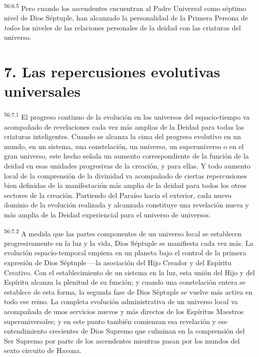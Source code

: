 \par
\textsuperscript{56:6.5} Pero cuando los ascendentes encuentran al Padre Universal como séptimo nivel de Dios Séptuple, han alcanzado la personalidad de la Primera Persona de \textit{todos} los niveles de las relaciones personales de la deidad con las criaturas del universo.

\section*{7. Las repercusiones evolutivas universales}
\par
\textsuperscript{56:7.1} El progreso continuo de la evolución en los universos del espacio-tiempo va acompañado de revelaciones cada vez más amplias de la Deidad para todas las criaturas inteligentes. Cuando se alcanza la cima del progreso evolutivo en un mundo, en un sistema, una constelación, un universo, un superuniverso o en el gran universo, este hecho señala un aumento correspondiente de la función de la deidad en esas unidades progresivas de la creación, y para ellas. Y todo aumento local de la comprensión de la divinidad va acompañado de ciertas repercusiones bien definidas de la manifestación más amplia de la deidad para todos los otros sectores de la creación. Partiendo del Paraíso hacia el exterior, cada nuevo dominio de la evolución realizada y alcanzada constituye una revelación nueva y más amplia de la Deidad experiencial para el universo de universos.

\par
\textsuperscript{56:7.2} A medida que las partes componentes de un universo local se establecen progresivamente en la luz y la vida, Dios Séptuple se manifiesta cada vez más. La evolución espacio-temporal empieza en un planeta bajo el control de la primera expresión de Dios Séptuple ---la asociación del Hijo Creador y del Espíritu Creativo. Con el establecimiento de un sistema en la luz, esta unión del Hijo y del Espíritu alcanza la plenitud de su función; y cuando una constelación entera se establece de esta forma, la segunda fase de Dios Séptuple se vuelve más activa en todo ese reino. La completa evolución administrativa de un universo local va acompañada de unos servicios nuevos y más directos de los Espíritus Maestros superuniversales; y en este punto también comienzan esa revelación y ese entendimiento crecientes de Dios Supremo que culminan en la comprensión del Ser Supremo por parte de los ascendentes mientras pasan por los mundos del sexto circuito de Havona.

